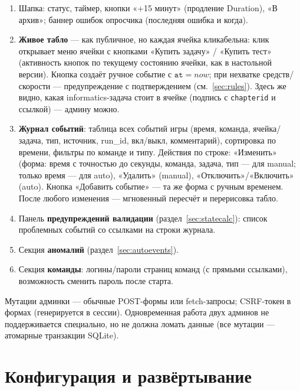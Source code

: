\documentclass[12pt,a4paper]{article}
\newcommand{\field}[1]{\texttt{#1}}
\newcommand{\btn}[1]{«#1»}
\begin{document}
\begin{enumerate}[nosep]
  \item Шапка: статус, таймер, кнопки \btn{+15 минут} (продление
        Duration), \btn{В архив}; баннер ошибок опросчика (последняя ошибка
        и когда).
  \item \textbf{Живое табло} --- как публичное, но каждая ячейка кликабельна:
        клик открывает меню ячейки с кнопками \btn{Купить задачу} /
        \btn{Купить тест} (активность кнопок по текущему состоянию ячейки,
        как в настольной версии). Кнопка создаёт ручное событие с
        $\field{at}=now$; при нехватке средств/скорости --- предупреждение
        с подтверждением (см.~\ref{sec:rules}). Здесь же видно, какая
        informatics-задача стоит в ячейке (подпись с \field{chapterid} и
        ссылкой) --- админу можно.
  \item \textbf{Журнал событий}: таблица всех событий игры (время,
        команда, ячейка/задача, тип, источник, run\_id, вкл/выкл,
        комментарий), сортировка по времени, фильтры по команде и типу.
        Действия по строке: \btn{Изменить} (форма: время с точностью до
        секунды, команда, задача, тип --- для manual; только время --- для
        auto), \btn{Удалить} (manual), \btn{Отключить}/\btn{Включить}
        (auto). Кнопка \btn{Добавить событие} --- та же форма с ручным
        временем. После любого изменения --- мгновенный пересчёт и
        перерисовка табло.
  \item Панель \textbf{предупреждений валидации} (раздел~\ref{sec:statecalc}):
        список проблемных событий со ссылками на строки журнала.
  \item Секция \textbf{аномалий} (раздел~\ref{sec:autoevents}).
  \item Секция \textbf{команды}: логины/пароли страниц команд (с прямыми
        ссылками), возможность сменить пароль после старта.
\end{enumerate}

Мутации админки --- обычные POST-формы или fetch-запросы; CSRF-токен в
формах (генерируется в сессии). Одновременная работа двух админов не
поддерживается специально, но не должна ломать данные (все мутации ---
атомарные транзакции SQLite).

\section{Конфигурация и развёртывание}
\end{document}
